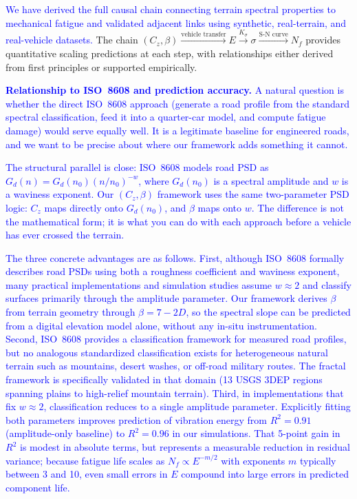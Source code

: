 \documentclass[11pt]{article}
\begin{document}
\textcolor{blue}{We have derived the full causal chain connecting terrain spectral properties to mechanical fatigue and validated adjacent links using synthetic, real-terrain, and real-vehicle datasets.} The chain $(C_z, \beta) \xrightarrow{\text{vehicle transfer}} E \xrightarrow{K_\sigma} \sigma \xrightarrow{\text{S-N curve}} N_f$ provides quantitative scaling predictions at each step, with relationships either derived from first principles or supported empirically.

\textcolor{blue}{\textbf{Relationship to ISO~8608 and prediction accuracy.} A natural question is whether the direct ISO~8608 approach (generate a road profile from the standard spectral classification, feed it into a quarter-car model, and compute fatigue damage) would serve equally well. It is a legitimate baseline for engineered roads, and we want to be precise about where our framework adds something it cannot.}

\textcolor{blue}{The structural parallel is close: ISO~8608\cite{ISO8608} models road PSD as $G_d(n) = G_d(n_0)(n/n_0)^{-w}$, where $G_d(n_0)$ is a spectral amplitude and $w$ is a waviness exponent. Our $(C_z, \beta)$ framework uses the same two-parameter PSD logic: $C_z$ maps directly onto $G_d(n_0)$, and $\beta$ maps onto $w$. The difference is not the mathematical form; it is what you can do with each approach before a vehicle has ever crossed the terrain.}

\textcolor{blue}{The three concrete advantages are as follows. First, although ISO~8608 formally describes road PSDs using both a roughness coefficient and waviness exponent, many practical implementations and simulation studies assume $w \approx 2$ and classify surfaces primarily through the amplitude parameter\cite{Mucka2018,Zuraulis2021}. Our framework derives $\beta$ from terrain geometry through $\beta = 7-2D$, so the spectral slope can be predicted from a digital elevation model alone, without any in-situ instrumentation. Second, ISO~8608 provides a classification framework for measured road profiles\cite{ISO8608}, but no analogous standardized classification exists for heterogeneous natural terrain such as mountains, desert washes, or off-road military routes. The fractal framework is specifically validated in that domain (13 USGS 3DEP regions spanning plains to high-relief mountain terrain). Third, in implementations that fix $w \approx 2$, classification reduces to a single amplitude parameter. Explicitly fitting both parameters improves prediction of vibration energy from $R^2 = 0.91$ (amplitude-only baseline) to $R^2 = 0.96$ in our simulations. That 5-point gain in $R^2$ is modest in absolute terms, but represents a measurable reduction in residual variance; because fatigue life scales as $N_f \propto E^{-m/2}$ with exponents $m$ typically between 3 and 10, even small errors in $E$ compound into large errors in predicted component life.}
\end{document}
